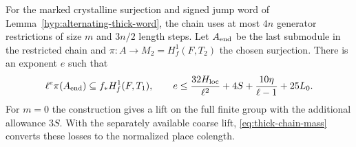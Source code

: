 \begin{proposition}\label{prop:thick-inert-colength}
For the marked crystalline surjection and signed jump word of
Lemma~\ref{hyp:alternating-thick-word}, the chain uses at most \(4n\) generator restrictions of
size \(m\) and \(3n/2\) length steps. Let \(A_{\rm end}\) be the last submodule in the restricted chain and
\(\pi:A\to M_2=H^1_f(F,T_2)\) the chosen surjection. There is an exponent \(e\) such that
\[
 \ell^e\pi(A_{\rm end})\subseteq f_*H^1_f(F,T_1),\qquad
 e\le \frac{32H_{\rm loc}}{\ell^2}+4S+\frac{10\eta}{\ell-1}+25L_0 .
\]
For \(m=0\) the construction gives a lift on the full finite
group with the additional allowance \(3S\). With the separately
available coarse lift, \eqref{eq:thick-chain-mass} converts these
losses to the normalized place colength.
\end{proposition}

